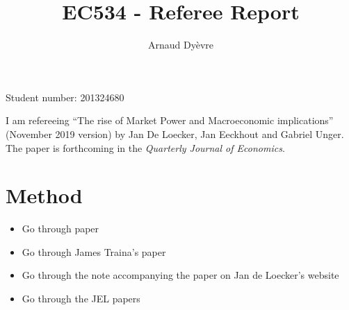 \documentclass{amsart}
\theoremstyle{definition}
\theoremstyle{remark}
\numberwithin{equation}{section}
\begin{document}
\title{EC534 - Referee Report}

\author{Arnaud Dy\`evre}







\maketitle

\begin{center}
Student number: 201324680
\end{center}


\vspace{12pt}

I am refereeing ``The rise of Market Power and Macroeconomic implications'' (November 2019 version) by Jan De Loecker, Jan Eeckhout and Gabriel Unger. The paper is forthcoming in the \textit{Quarterly Journal of Economics}.

\newpage 

\section{Method}

\begin{itemize}
    \item Go through paper
    \item Go through James Traina's paper
    \item Go through the note accompanying the paper on Jan de Loecker's website
    \item Go through the JEL papers
\end{itemize}
\end{document}

